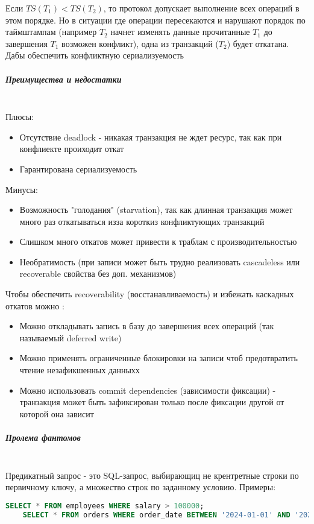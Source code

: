 Если $TS(T_1) < TS(T_2)$, то протокол допускает выполнение всех операций в этом порядке. Но в ситуации где операции пересекаются и нарушают порядок по таймштампам (например $T_2$ начнет изменять данные прочитанные $T_1$ до завершения $T_1$ \textrightarrow возможен конфликт), одна из транзакций ($T_2$) будет откатана. Дабы обеспечить конфликтную сериализуемость

\subparagraph{Преимущества и недостатки} ~\\
Плюсы:
\begin{itemize}
    \item Отсутствие deadlock - никакая транзакция не ждет ресурс, так как при конфлиекте проиходит откат
    \item Гарантирована сериализуемость
\end{itemize}

Минусы:
\begin{itemize}
    \item Возможность "голодания" (starvation), так как длинная транзакция может много раз откатываться изза короткиз конфликтующих транзакций
    \item Слишком много откатов может привести к траблам с производительностью
    \item Необратимость (при записи может быть трудно реализовать cascadeless или recoverable свойства без доп. механизмов) \autocite{Silberschatz}
\end{itemize}

Чтобы обеспечить recoverability (восстанавливаемость) и избежать каскадных откатов можно \autocite{Silberschatz, ElmasriNavathe}:
\begin{itemize}
    \item Можно откладывать запись в базу до завершения всех операций (так называемый deferred write)
    \item Можно применять ограниченные блокировки на записи чтоб предотвратить чтение незафикшенных данныхх
    \item Можно использовать commit dependencies (зависимости фиксации) - транзакция может быть зафиксирован только после фиксации другой от которой она зависит
\end{itemize}

\subparagraph{Пролема фантомов} ~\\

Предикатный запрос - это SQL-запрос, выбирающиц не крентретные строки по первичному ключу, а множество строк по заданному условию. Примеры:
\begin{lstlisting}[language=SQL]
    SELECT * FROM employees WHERE salary > 100000;
    SELECT * FROM orders WHERE order_date BETWEEN '2024-01-01' AND '2024-03-01';       
\end{lstlisting}

